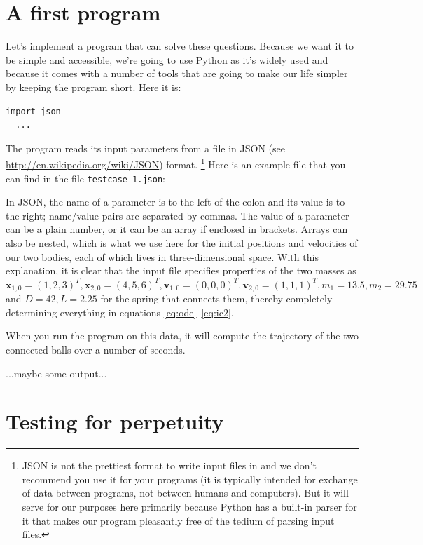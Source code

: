 \documentclass{article}
\begin{document}
\section{A first program}

Let's implement a program that can solve these questions. Because we want it
to be simple and accessible, we're going to use Python as it's widely used and
because it comes with a number of tools that are going to make our life
simpler by keeping the program short. Here it is:
\begin{lstlisting}[frame=single,basicstyle=\footnotesize]
  import json
  ...
\end{lstlisting}
The program reads its input parameters from a file in JSON (see
\url{http://en.wikipedia.org/wiki/JSON}) format.%
\footnote{JSON is not the prettiest format to write input files in and we
  don't recommend you use it for your programs (it is typically intended for
  exchange of data between programs, not between humans and computers). But it
  will serve for our purposes here primarily because Python has a built-in
  parser for it that makes our program pleasantly free of the tedium of
  parsing input files.}
Here is an example file that you can find in the file \texttt{testcase-1.json}:

In JSON, the name of a parameter is to the left of the colon and its value is
to the right; name/value pairs are separated by commas. The value of a
parameter can be a plain number, or it can be an array if enclosed in
brackets. Arrays can also be nested, which is what we use here for the initial
positions and velocities of our two bodies, each of which lives in
three-dimensional space. With this explanation, it is clear that the input file
specifies properties of the two masses as $\mathbf x_{1,0}=(1,2,3)^T, \mathbf
x_{2,0}=(4,5,6)^T, \mathbf v_{1,0}=(0,0,0)^T, \mathbf v_{2,0}=(1,1,1)^T,
m_1=13.5, m_2=29.75$ and $D=42, L=2.25$ for the spring that connects them, 
thereby completely determining everything in equations
\eqref{eq:ode}--\eqref{eq:ic2}.

When you run the program on this data, it will compute the trajectory of the
two connected balls over a number of seconds.

...maybe some output...


\section{Testing for perpetuity}
\end{document}
